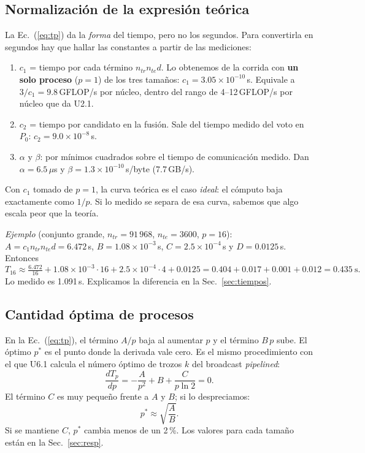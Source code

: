 \documentclass[11pt,a4paper]{article}
\newcommand{\ntr}{n_{tr}}
\newcommand{\nte}{n_{te}}
\begin{document}
\subsection{Normalización de la expresión teórica}\label{sec:norm}
La Ec.~(\ref{eq:tp}) da la \emph{forma} del tiempo, pero no los segundos. Para convertirla en segundos hay que hallar las constantes a partir de las mediciones:
\begin{enumerate}
\item $c_1$ = tiempo por cada término $\ntr\nte d$. Lo obtenemos de la corrida con \textbf{un solo proceso} ($p=1$) de los tres tamaños: $c_1=3.05\times10^{-10}$\,s. Equivale a $3/c_1=9.8$\,GFLOP/s por núcleo, dentro del rango de 4--12\,GFLOP/s por núcleo que da U2.1.
\item $c_2$ = tiempo por candidato en la fusión. Sale del tiempo medido del voto en $P_0$: $c_2=9.0\times10^{-8}$\,s.
\item $\alpha$ y $\beta$: por mínimos cuadrados sobre el tiempo de comunicación medido. Dan $\alpha=6.5\,\mu$s y $\beta=1.3\times10^{-10}$\,s/byte (7.7\,GB/s).
\end{enumerate}
Con $c_1$ tomado de $p=1$, la curva teórica es el caso \emph{ideal}: el cómputo baja exactamente como $1/p$. Si lo medido se separa de esa curva, sabemos que algo escala peor que la teoría.

\emph{Ejemplo} (conjunto grande, $\ntr=91\,968$, $\nte=3600$, $p=16$): $A=c_1\ntr\nte d=6.472$\,s, $B=1.08\times10^{-3}$\,s, $C=2.5\times10^{-4}$\,s y $D=0.0125$\,s. Entonces
\[
T_{16}\approx\tfrac{6.472}{16}+1.08\times10^{-3}\cdot16+2.5\times10^{-4}\cdot4+0.0125=0.404+0.017+0.001+0.012=0.435\ \text{s}.
\]
Lo medido es 1.091\,s. Explicamos la diferencia en la Sec.~\ref{sec:tiempos}.

\subsection{Cantidad óptima de procesos}\label{sec:pstar}
En la Ec.~(\ref{eq:tp}), el término $A/p$ baja al aumentar $p$ y el término $B\,p$ sube. El óptimo $p^*$ es el punto donde la derivada vale cero. Es el mismo procedimiento con el que U6.1 calcula el número óptimo de trozos $k$ del broadcast \emph{pipelined}:
\[
\frac{dT_p}{dp}=-\frac{A}{p^2}+B+\frac{C}{p\ln2}=0.
\]
El término $C$ es muy pequeño frente a $A$ y $B$; si lo despreciamos:
\begin{equation}
p^*\approx\sqrt{\frac{A}{B}}.\label{eq:pstar}
\end{equation}
Si se mantiene $C$, $p^*$ cambia menos de un 2\,\%. Los valores para cada tamaño están en la Sec.~\ref{sec:resp}.
\end{document}
